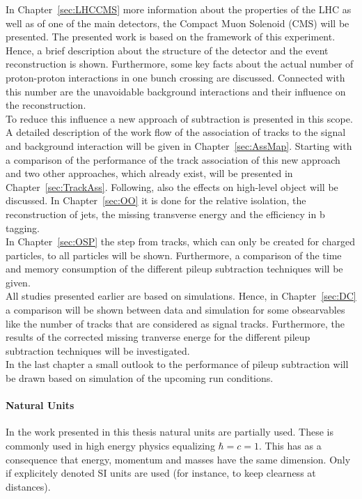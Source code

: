 In Chapter~\ref{sec:LHCCMS} more information about the properties of the LHC as well as of one of the main detectors, the Compact Muon Solenoid (CMS) will be presented. The presented work is based on the framework of this experiment. Hence, a brief description about the structure of the detector and the event reconstruction is shown. Furthermore, some key facts about the actual number of proton-proton interactions in one bunch crossing are discussed. Connected with this number are the unavoidable background interactions and their influence on the reconstruction. \\
To reduce this influence a new approach of subtraction is presented in this scope. A detailed description of the work flow of the association of tracks to the signal and background interaction will be given in Chapter~\ref{sec:AssMap}. Starting with a comparison of the performance of the track association of this new approach and two other approaches, which already exist, will be presented in Chapter~\ref{sec:TrackAss}. Following, also the effects on high-level object will be discussed. In Chapter~\ref{sec:OO} it is done for the relative isolation, the reconstruction of jets, the missing transverse energy and the efficiency in b tagging. \\
In Chapter~\ref{sec:OSP} the step from tracks, which can only be created for charged particles, to all particles will be shown. Furthermore, a comparison of the time and memory consumption of the different pileup subtraction techniques will be given. \\
All studies presented earlier are based on simulations. Hence, in Chapter~\ref{sec:DC} a comparison will be shown between data and simulation for some obsearvables like the number of tracks that are considered as signal tracks. Furthermore, the results of the corrected missing tranverse energe for the different pileup subtraction techniques will be investigated. \\
In the last chapter a small outlook to the performance of pileup subtraction will be drawn based on simulation of the upcoming run conditions. 

\paragraph*{Natural Units}

In the work presented in this thesis natural units are partially used. These is commonly used in high energy physics equalizing $\hbar{} = c = 1$. This has as a consequence that energy, momentum and masses have the same dimension. Only if explicitely denoted SI units are used (for instance, to keep clearness at distances).
